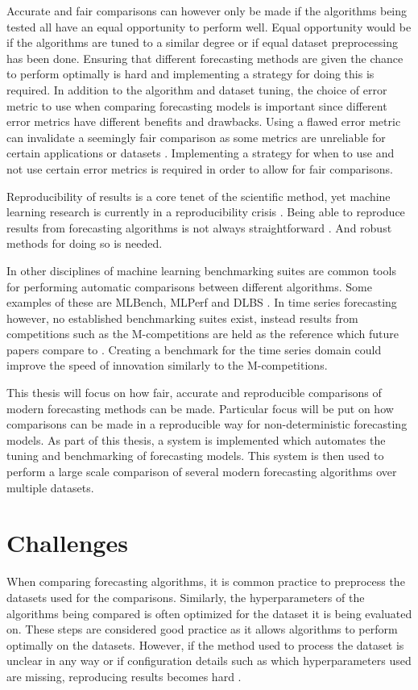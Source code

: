 Accurate and fair comparisons can however only be made if the algorithms being tested all have an equal opportunity to perform well. Equal opportunity would be if the algorithms are tuned to a similar degree or if equal dataset preprocessing has been done. Ensuring that different forecasting methods are given the chance to perform optimally is hard and implementing a strategy for doing this is required. In addition to the algorithm and dataset tuning, the choice of error metric to use when comparing forecasting models is important since different error metrics have different benefits and drawbacks. Using a flawed error metric can invalidate a seemingly fair comparison as some metrics are unreliable for certain applications or datasets \cite{goodwin_asymmetry_1999}. Implementing a strategy for when to use and not use certain error metrics is required in order to allow for fair comparisons.

Reproducibility of results is a core tenet of the scientific method, yet machine learning research is currently in a reproducibility crisis \cite{beam2020challenges, mcdermott2019reproducibility}. Being able to reproduce results from forecasting algorithms is not always straightforward \cite{makridakis_m4_2020}. And robust methods for doing so is needed.

In other disciplines of machine learning benchmarking suites are common tools for performing automatic comparisons between different algorithms. Some examples of these are MLBench, MLPerf and DLBS \cite{noauthor_mlbench_nodate,mattson_mlperf_2020,vassilieva_deep_nodate}. In time series forecasting however, no established benchmarking suites exist, instead results from competitions such as the M-competitions are held as the reference which future papers compare to \cite{m3_competition,makridakis_m4_2020,m5}. Creating a benchmark for the time series domain could improve the speed of innovation similarly to the M-competitions.

This thesis will focus on how fair, accurate and reproducible comparisons of modern forecasting methods can be made. Particular focus will be put on how comparisons can be made in a reproducible way for non-deterministic forecasting models. As part of this thesis, a system is implemented which automates the tuning and benchmarking of forecasting models. This system is then used to perform a large scale comparison of several modern forecasting algorithms over multiple datasets.

\section{Challenges}
When comparing forecasting algorithms, it is common practice to preprocess the datasets used for the comparisons. Similarly, the hyperparameters of the algorithms being compared is often optimized for the dataset it is being evaluated on. These steps are considered good practice as it allows algorithms to perform optimally on the datasets. However, if the method used to process the dataset is unclear in any way or if configuration details such as which hyperparameters used are missing, reproducing results becomes hard \cite{makridakis_m4_2020}.

